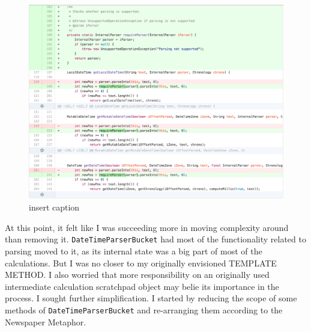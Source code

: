 \begin{figure}[H]
	\centering
	\includegraphics[width=\linewidth]{code62}
	\caption{insert caption}
\end{figure}

At this point, it felt like I was succeeding more in moving complexity around than removing it. \texttt{DateTimeParserBucket} had most of the functionality related to parsing moved to it, as its internal state was a big part of most of the calculations. But I was no closer to my originally envisioned TEMPLATE METHOD. I also worried that more responsibility on an originally used intermediate calculation scratchpad object may belie its importance in the process. I sought further simplification. I started by reducing the scope of some methods of \texttt{DateTimeParserBucket} and re-arranging them according to the Newspaper Metaphor.

